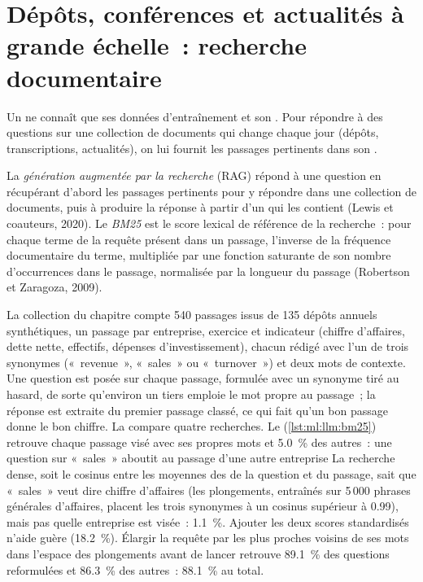\section{Dépôts, conférences et actualités à grande échelle~: recherche documentaire}

Un  ne connaît que ses données d'entraînement et son . Pour répondre à des questions sur une collection de documents qui change
chaque jour (dépôts, transcriptions, actualités), on lui fournit les passages pertinents dans son .

\begin{definition}\label{def:ml:large-language-models-in-finance:rag}
La \emph{génération augmentée par la recherche} (RAG) répond à une question en récupérant
d'abord les passages pertinents pour y répondre dans une collection de documents, puis à produire la réponse à partir d'un  qui les contient (Lewis
et coauteurs, 2020). Le \emph{BM25} est le score lexical de référence de la recherche~: pour chaque terme de la requête présent dans un
passage, l'inverse de la fréquence documentaire du terme, multipliée par une fonction saturante de son nombre d'occurrences dans le passage, normalisée par la
longueur du passage (Robertson et Zaragoza, 2009).
\end{definition}

La collection du chapitre compte 540 passages issus de 135 dépôts annuels synthétiques, un passage par entreprise, exercice et
indicateur (chiffre d'affaires, dette nette, effectifs, dépenses d'investissement), chacun rédigé avec l'un de trois synonymes («~revenue~», «~sales~»
ou «~turnover~») et deux mots de contexte. Une question est posée sur chaque passage, formulée avec un synonyme tiré au hasard, de sorte
qu'environ un tiers emploie le mot propre au passage~; la réponse est extraite du premier passage classé, ce qui fait qu'un bon passage
donne le bon chiffre. La  compare quatre recherches. Le  (\cref{lst:ml:llm:bm25}) retrouve chaque
passage visé avec ses propres mots et 5.0~\% des autres~: une question sur «~sales~» aboutit au passage d'une autre entreprise
La recherche dense, soit le cosinus entre les moyennes des  de la question et du passage, sait que
«~sales~» veut dire chiffre d'affaires (les plongements, entraînés sur 5\,000 phrases générales d'affaires, placent les trois synonymes à un cosinus
supérieur à 0.99), mais pas quelle entreprise est visée~: 1.1~\%. Ajouter les deux scores standardisés n'aide guère (18.2~\%). Élargir
la requête par les plus proches voisins de ses mots dans l'espace des plongements avant de lancer  retrouve 89.1~\% des questions reformulées et 86.3~\% des
autres~: 88.1~\% au total.

